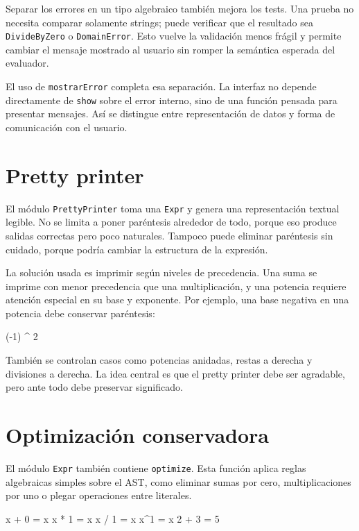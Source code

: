 \documentclass[11pt,a4paper]{article}
\newenvironment{lstlisting}{\verbatim}{\endverbatim}
\begin{document}
Separar los errores en un tipo algebraico también mejora los tests. Una prueba no necesita comparar solamente strings; puede verificar que el resultado sea \texttt{DivideByZero} o \texttt{DomainError}. Esto vuelve la validación menos frágil y permite cambiar el mensaje mostrado al usuario sin romper la semántica esperada del evaluador.

El uso de \texttt{mostrarError} completa esa separación. La interfaz no depende directamente de \texttt{show} sobre el error interno, sino de una función pensada para presentar mensajes. Así se distingue entre representación de datos y forma de comunicación con el usuario.

\section{Pretty printer}

El módulo \texttt{PrettyPrinter} toma una \texttt{Expr} y genera una representación textual legible. No se limita a poner paréntesis alrededor de todo, porque eso produce salidas correctas pero poco naturales. Tampoco puede eliminar paréntesis sin cuidado, porque podría cambiar la estructura de la expresión.

La solución usada es imprimir según niveles de precedencia. Una suma se imprime con menor precedencia que una multiplicación, y una potencia requiere atención especial en su base y exponente. Por ejemplo, una base negativa en una potencia debe conservar paréntesis:

\begin{lstlisting}
(-1) ^ 2
\end{lstlisting}

También se controlan casos como potencias anidadas, restas a derecha y divisiones a derecha. La idea central es que el pretty printer debe ser agradable, pero ante todo debe preservar significado.

\section{Optimización conservadora}

El módulo \texttt{Expr} también contiene \texttt{optimize}. Esta función aplica reglas algebraicas simples sobre el AST, como eliminar sumas por cero, multiplicaciones por uno o plegar operaciones entre literales.

\begin{lstlisting}
x + 0 = x
x * 1 = x
x / 1 = x
x^1 = x
2 + 3 = 5
\end{lstlisting}
\end{document}

